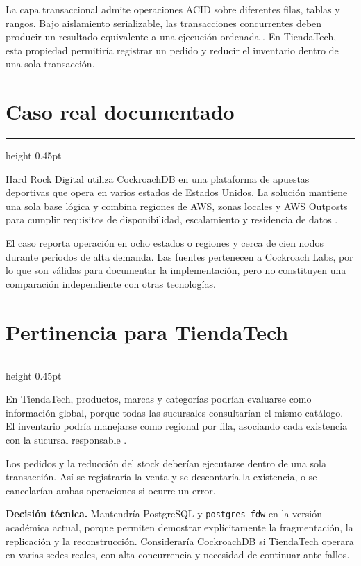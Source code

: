 \documentclass[11pt,a4paper]{article}
\newcommand{\sectionrule}{
    \vspace{-1pt}
    {\color{grisMedio}\hrule height 0.45pt}
    \vspace{2pt}
}
\begin{document}
La capa transaccional admite operaciones ACID sobre diferentes filas, tablas
y rangos. Bajo aislamiento serializable, las transacciones concurrentes deben
producir un resultado equivalente a una ejecución ordenada
\cite{transactionlayer,vanbenschoten2022}. En TiendaTech, esta propiedad
permitiría registrar un pedido y reducir el inventario dentro de una sola
transacción.

\section{Caso real documentado}
\sectionrule

Hard Rock Digital utiliza CockroachDB en una plataforma de apuestas deportivas
que opera en varios estados de Estados Unidos. La solución mantiene una sola
base lógica y combina regiones de AWS, zonas locales y AWS Outposts para
cumplir requisitos de disponibilidad, escalamiento y residencia de datos
\cite{hardrockcase,hardrockblog}.

El caso reporta operación en ocho estados o regiones y cerca de cien nodos
durante periodos de alta demanda. Las fuentes pertenecen a Cockroach Labs, por
lo que son válidas para documentar la implementación, pero no constituyen una
comparación independiente con otras tecnologías.

\section{Pertinencia para TiendaTech}
\sectionrule

En TiendaTech, productos, marcas y categorías podrían evaluarse como
información global, porque todas las sucursales consultarían el mismo
catálogo. El inventario podría manejarse como regional por fila, asociando
cada existencia con la sucursal responsable
\cite{vanbenschoten2022,ajmani2022}.

Los pedidos y la reducción del stock deberían ejecutarse dentro de una sola
transacción. Así se registraría la venta y se descontaría la existencia, o se
cancelarían ambas operaciones si ocurre un error.

\begin{decisionbox}
\textbf{\textcolor{verdeBorde}{Decisión técnica.}}
Mantendría PostgreSQL y \texttt{postgres\_fdw} en la versión académica actual,
porque permiten demostrar explícitamente la fragmentación, la replicación y
la reconstrucción. Consideraría CockroachDB si TiendaTech operara en varias
sedes reales, con alta concurrencia y necesidad de continuar ante fallos.
\end{decisionbox}
\end{document}
